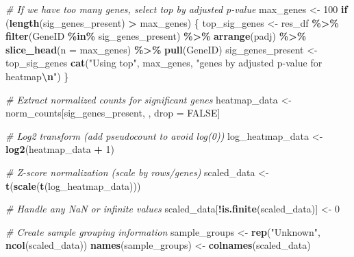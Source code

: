 \documentclass[
]{article}
\newenvironment{Shaded}{\begin{snugshade}}{\end{snugshade}}
\newcommand{\AttributeTok}[1]{\textcolor[rgb]{0.13,0.29,0.53}{#1}}
\newcommand{\CommentTok}[1]{\textcolor[rgb]{0.56,0.35,0.01}{\textit{#1}}}
\newcommand{\ConstantTok}[1]{\textcolor[rgb]{0.56,0.35,0.01}{#1}}
\newcommand{\ControlFlowTok}[1]{\textcolor[rgb]{0.13,0.29,0.53}{\textbf{#1}}}
\newcommand{\DecValTok}[1]{\textcolor[rgb]{0.00,0.00,0.81}{#1}}
\newcommand{\FunctionTok}[1]{\textcolor[rgb]{0.13,0.29,0.53}{\textbf{#1}}}
\newcommand{\NormalTok}[1]{#1}
\newcommand{\OtherTok}[1]{\textcolor[rgb]{0.56,0.35,0.01}{#1}}
\newcommand{\SpecialCharTok}[1]{\textcolor[rgb]{0.81,0.36,0.00}{\textbf{#1}}}
\newcommand{\StringTok}[1]{\textcolor[rgb]{0.31,0.60,0.02}{#1}}
\begin{document}
\begin{Shaded}
\begin{Highlighting}[]
\CommentTok{\# If we have too many genes, select top by adjusted p{-}value}
\NormalTok{max\_genes }\OtherTok{\textless{}{-}} \DecValTok{100}
\ControlFlowTok{if}\NormalTok{ (}\FunctionTok{length}\NormalTok{(sig\_genes\_present) }\SpecialCharTok{\textgreater{}}\NormalTok{ max\_genes) \{}
\NormalTok{  top\_sig\_genes }\OtherTok{\textless{}{-}}\NormalTok{ res\_df }\SpecialCharTok{\%\textgreater{}\%}
    \FunctionTok{filter}\NormalTok{(GeneID }\SpecialCharTok{\%in\%}\NormalTok{ sig\_genes\_present) }\SpecialCharTok{\%\textgreater{}\%}
    \FunctionTok{arrange}\NormalTok{(padj) }\SpecialCharTok{\%\textgreater{}\%}
    \FunctionTok{slice\_head}\NormalTok{(}\AttributeTok{n =}\NormalTok{ max\_genes) }\SpecialCharTok{\%\textgreater{}\%}
    \FunctionTok{pull}\NormalTok{(GeneID)}
\NormalTok{  sig\_genes\_present }\OtherTok{\textless{}{-}}\NormalTok{ top\_sig\_genes}
  \FunctionTok{cat}\NormalTok{(}\StringTok{"Using top"}\NormalTok{, max\_genes, }\StringTok{"genes by adjusted p{-}value for heatmap}\SpecialCharTok{\textbackslash{}n}\StringTok{"}\NormalTok{)}
\NormalTok{\}}

\CommentTok{\# Extract normalized counts for significant genes}
\NormalTok{heatmap\_data }\OtherTok{\textless{}{-}}\NormalTok{ norm\_counts[sig\_genes\_present, , drop }\OtherTok{=} \ConstantTok{FALSE}\NormalTok{]}

\CommentTok{\# Log2 transform (add pseudocount to avoid log(0))}
\NormalTok{log\_heatmap\_data }\OtherTok{\textless{}{-}} \FunctionTok{log2}\NormalTok{(heatmap\_data }\SpecialCharTok{+} \DecValTok{1}\NormalTok{)}

\CommentTok{\# Z{-}score normalization (scale by rows/genes)}
\NormalTok{scaled\_data }\OtherTok{\textless{}{-}} \FunctionTok{t}\NormalTok{(}\FunctionTok{scale}\NormalTok{(}\FunctionTok{t}\NormalTok{(log\_heatmap\_data)))}

\CommentTok{\# Handle any NaN or infinite values}
\NormalTok{scaled\_data[}\SpecialCharTok{!}\FunctionTok{is.finite}\NormalTok{(scaled\_data)] }\OtherTok{\textless{}{-}} \DecValTok{0}

\CommentTok{\# Create sample grouping information}
\NormalTok{sample\_groups }\OtherTok{\textless{}{-}} \FunctionTok{rep}\NormalTok{(}\StringTok{"Unknown"}\NormalTok{, }\FunctionTok{ncol}\NormalTok{(scaled\_data))}
\FunctionTok{names}\NormalTok{(sample\_groups) }\OtherTok{\textless{}{-}} \FunctionTok{colnames}\NormalTok{(scaled\_data)}


\end{Highlighting}
\end{Shaded}
\end{document}
